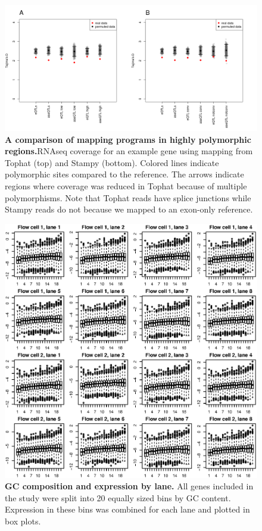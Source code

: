 \begin{figure}[ht]
      \centering
       \includegraphics[width=\linewidth]{Ch3FigS6}
    \caption{\textbf{A comparison of mapping programs in highly polymorphic regions.}RNAseq coverage for an example gene using mapping from Tophat (top) and Stampy (bottom). Colored lines indicate polymorphic sites compared to the reference. The arrows indicate regions where coverage was reduced in Tophat because of multiple polymorphisms. Note that Tophat reads have splice junctions while Stampy reads do not because we mapped to an exon-only reference.}
    \label{fig:3figS6}
\end{figure}

\begin{figure}[ht]
      \centering
       \includegraphics[width=\linewidth]{Ch3FigS7}
    \caption{\textbf{GC composition and expression by lane.} All genes included in the study were split into 20 equally sized bins by GC content. Expression in these bins was combined for each lane and plotted in box plots.}
    \label{fig:3figS7}
\end{figure}

